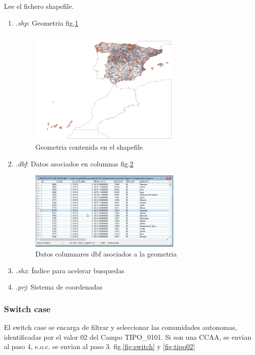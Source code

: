 Lee el fichero shapefile.
\begin{enumerate}
    \item \textit{.shp}: Geometria fig.\ref{fig:shapefile}

        \begin{figure}[H]
            \includegraphics[width=0.7\textwidth]{images/shapefile.png}
            \centering
            \caption{Geometria contenida en el shapefile}
            \label{fig:shapefile}
        \end{figure}

    \item \textit{.dbf}: Datos asociados en columnas fig.\ref{fig:dbf}

        \begin{figure}[H]
            \includegraphics[width=0.7\textwidth]{images/dbf.png}
            \centering
            \caption{Datos columnares dbf asociados a la geometria}
            \label{fig:dbf}
        \end{figure}

    \item \textit{.shx}: Índice para acelerar busquedas
    \item \textit{.prj}: Sistema de coordenadas
\end{enumerate}

\subsubsection{Switch case}
El switch case se encarga de filtrar y seleccionar las comunidades autonomas, identificadas por el valor 02 del
Campo TIPO\_0101. Si son una CCAA, se envian al paso 4, e.o.c. se envian al paso 3. fig.\ref{fig:switch} y
\ref{fig:tipo02}

